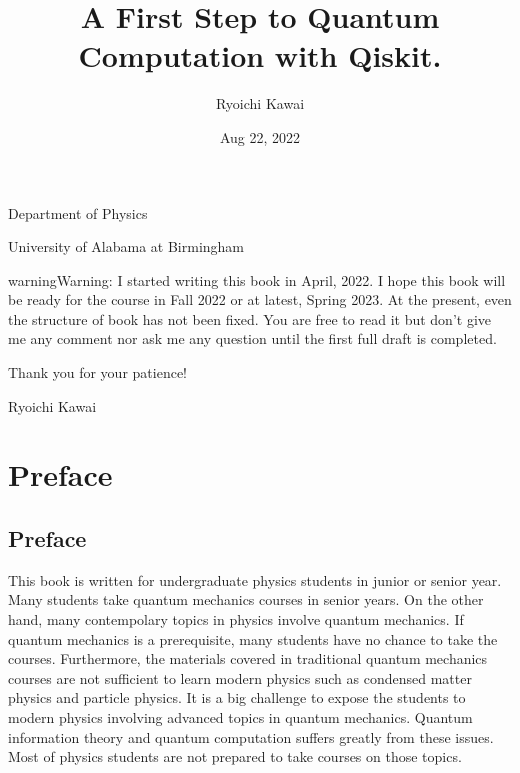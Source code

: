 \documentclass[letterpaper,10pt,english]{jupyterBook}
\title{A First Step to Quantum Computation with Qiskit.}
\date{Aug 22, 2022}
\author{Ryoichi Kawai}
\begin{document}
\pagestyle{empty}
\sphinxmaketitle
\pagestyle{plain}
\sphinxtableofcontents
\pagestyle{normal}
\label{\detokenize{cover::doc}}


\sphinxAtStartPar
{}

\sphinxAtStartPar
Department of Physics

\sphinxAtStartPar
University of Alabama at Birmingham

\sphinxAtStartPar
{}

\sphinxAtStartPar
{}

\begin{sphinxadmonition}{warning}{Warning:}
\sphinxAtStartPar
I started writing this book in April, 2022.   I hope this book will be ready for the course in Fall 2022 or at latest, Spring 2023.  At the present, even the structure of book has not been fixed. You are free to read it but don’t give me any comment nor ask me any question until the first full draft is completed.

\sphinxAtStartPar
Thank you for your patience!

\sphinxAtStartPar
Ryoichi Kawai
\end{sphinxadmonition}

\sphinxstepscope


\part{Preface}

\sphinxstepscope


\chapter{Preface}
\label{\detokenize{preface:preface}}\label{\detokenize{preface::doc}}
\sphinxAtStartPar
This book is written for undergraduate physics students in junior or senior year.  Many students take quantum mechanics courses in senior years.  On the other hand, many contempolary topics in physics involve quantum mechanics.  If quantum mechanics is a prerequisite, many students have no chance to take the courses. Furthermore, the materials covered in traditional quantum mechanics courses are not sufficient to learn modern physics such as condensed matter physics and particle physics. It is a big challenge to expose the students to modern physics involving advanced topics in quantum mechanics.
Quantum information theory and quantum computation suffers greatly from these issues.  Most of physics students are not prepared to take courses on those topics.
\end{document}
